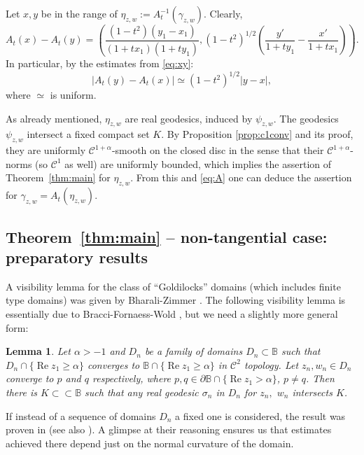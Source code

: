 \documentclass[a4paper,12pt]{amsart}
\def\re{\operatorname{Re}}
\newtheorem{lemma}[theorem]{Lemma}
\theoremstyle{remark}\newtheorem{remark}[theorem]{Remark}
\begin{document}
Let $x,y$ be in the range of  $\eta_{z,w}:=A_t^{-1}(\gamma_{z,w})$. Clearly,
$$A_t(x) - A_t(y) = \left( \frac{(1-t^2) (y_1 - x_1)}{(1 + t x_1)(1+ty_1)}, (1-t^2)^{1/2}( \frac{ y'}{1 + t y_1} - \frac{x' }{1 + tx_1}) \right).$$
In particular, by the estimates from \eqref{eq:xy}:
\begin{equation}\label{eq:A}|A_t(y) - A_t(x)|\simeq (1-t^2)^{1/2} |y- x|,
\end{equation}
where $\simeq$ is uniform. 


As already mentioned, $\eta_{z,w}$ are real geodesics, induced by 
$\psi_{z,w}$.
The geodesics $\psi_{z,w}$ intersect a fixed compact set $K$. 
By Proposition \ref{prop:c1conv} and its proof,
they are uniformly $\mathcal C^{1+\alpha}$-smooth on the closed disc in the sense that their $\mathcal C^{1+\alpha}$-norms (so $\mathcal C^1$ as well) are uniformly bounded, which implies the assertion of Theorem~\ref{thm:main} for $\eta_{z,w}$. 
From this and \eqref{eq:A} one can deduce the assertion for $\gamma_{z,w}=A_t(\eta_{z,w})$.



\subsection{Theorem~\ref{thm:main} -- non-tangential case: preparatory results}

A visibility
lemma for the class of ``Goldilocks'' domains (which includes
finite type domains) was given by Bharali-Zimmer \cite{BZ}. 
The following visibility lemma is essentially due to Bracci-Fornaess-Wold \cite{BFW},
but we need a slightly more general form:
\begin{lemma}\label{lem:1}
Let $\alpha>-1$ and $D_n$ be a family of domains $D_n \subset \mathbb B$ such that $D_n\cap \{\re z_1\geq \alpha\}$ converges to $\mathbb B\cap \{\re z_1\geq \alpha\}$ in $\mathcal C^2$ topology. Let $z_n, w_n\in D_n$ converge to $p$ and $q$ respectively, where $p,q\in \partial \mathbb B \cap \{\re z_1 >\alpha\}$, $p\neq q$. Then there is $K\subset \subset \mathbb B$ such that any real geodesic $\sigma_n$ in $D_n$ for $z_n,$ $w_n$ intersects $K$.
\end{lemma}

If instead of a sequence of domains $D_n$ a fixed one is considered, the result was proven in \cite{BFW} (see also \cite{BZ}). A glimpse at their reasoning ensures us that estimates achieved there depend just on the normal curvature of the domain.
\end{document}
